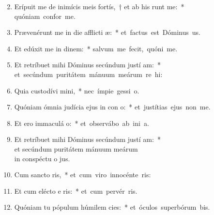 \begin{flushleft}
\begin{enumerate}[leftmargin=*]
\setcounter{enumi}{1}

\item Erípuit me de inimícis meis fortís,~† et ab his  runt me:~* \mbox{quóniam confor   me.}
\item Prævenérunt me in die afflicti æ:~* \mbox{et factus est Dóminus  us.}
\item Et edúxit me in dinem:~* \mbox{salvum me fecit, quóni  me.}
\item Et retríbuet mihi Dóminus secúndum justí am:~* \mbox{et secúndum puritátem mánuum meárum re hi:}
\item Quia custodívi  mini,~* \mbox{nec ímpie gessi   o.}
\item Quóniam ómnia judícia ejus in con o:~* \mbox{et justítias ejus non   me.}
\item Et ero immaculá  o:~* \mbox{et observábo ab ini a.}
\item Et retríbuet mihi Dóminus secúndum justí am:~* \\et secúndum puritátem mánuum meárum \\in conspéctu o jus.
\item Cum sancto  ris,~* \mbox{et cum viro innocénte  ris:}
\item Et cum elécto e ris:~* \mbox{et cum pervér ris.}
\item Quóniam tu pópulum húmilem  cies:~* \mbox{et óculos superbórum bis.}

\end{enumerate}
\end{flushleft}
